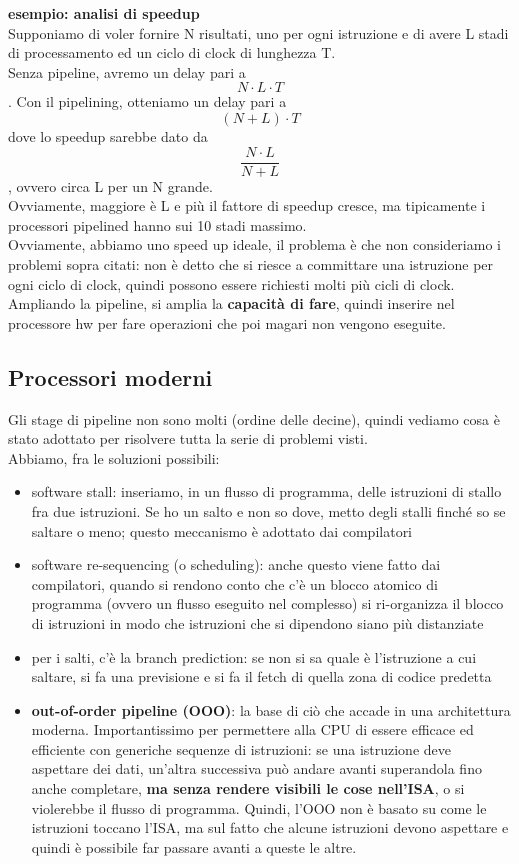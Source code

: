 \documentclass[12pt, oneside]{extbook}
\begin{document}
\textbf{esempio: analisi di speedup}\\
Supponiamo di voler fornire N risultati, uno per ogni istruzione e di avere L stadi di processamento ed un ciclo di clock di lunghezza T.\\ Senza pipeline, avremo un delay pari a \[ N \cdot L \cdot T\]. Con il pipelining, otteniamo un delay pari a \[(N+L)\cdot T\] dove lo speedup sarebbe dato da \[\frac{N \cdot L}{N+L}\], ovvero circa L per un N grande.\\ Ovviamente, maggiore è L e più il fattore di speedup cresce, ma tipicamente i processori pipelined hanno sui 10 stadi massimo.\\ Ovviamente, abbiamo uno speed up ideale, il problema è che non consideriamo i problemi sopra citati: non è detto che si riesce a committare una istruzione per ogni ciclo di clock, quindi possono essere richiesti molti più cicli di clock. Ampliando la pipeline, si amplia la \textbf{capacità di fare}, quindi inserire nel processore hw per fare operazioni che poi magari non vengono eseguite.
\subsection{Processori moderni}
Gli stage di pipeline non sono molti (ordine delle decine), quindi vediamo cosa è stato adottato per risolvere tutta la serie di problemi visti.\\ Abbiamo, fra le soluzioni possibili:
\begin{itemize}
\item software stall: inseriamo, in un flusso di programma, delle istruzioni di stallo fra due istruzioni. Se ho un salto e non so dove, metto degli stalli finché so se saltare o meno; questo meccanismo è adottato dai compilatori
\item software re-sequencing (o scheduling): anche questo viene fatto dai compilatori, quando si rendono conto che c'è un blocco atomico di programma (ovvero un flusso eseguito nel complesso) si ri-organizza il blocco di istruzioni in modo che istruzioni che si dipendono siano più distanziate
\item per i salti, c'è la branch prediction: se non si sa quale è l'istruzione a cui saltare, si fa una previsione e si fa il fetch di quella zona di codice predetta
\item \textbf{out-of-order pipeline (OOO)}: la base di ciò che accade in una architettura moderna. Importantissimo per permettere alla CPU di essere efficace ed efficiente con generiche sequenze di istruzioni: se una istruzione deve aspettare dei dati, un'altra successiva può andare avanti superandola fino anche completare, \textbf{ma senza rendere visibili le cose nell'ISA}, o si violerebbe il flusso di programma. Quindi, l'OOO non è basato su come le istruzioni toccano l'ISA, ma sul fatto che alcune istruzioni devono aspettare e quindi è possibile far passare avanti a queste le altre.
\end{itemize}
\end{document}
